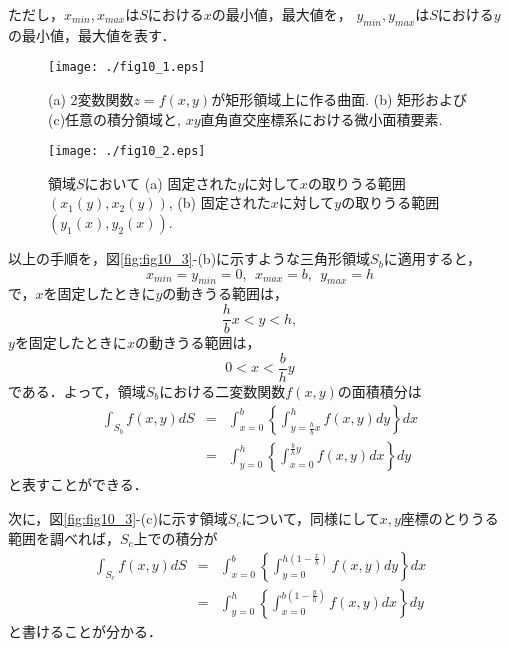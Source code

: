 \documentclass[10pt,a4j]{jarticle}
\begin{document}
ただし，$x_{min},x_{max}$は$S$における$x$の最小値，最大値を，
$y_{min},y_{max}$は$S$における$y$の最小値，最大値を表す．
\begin{figure}[h]
	\begin{center}
	\texttt{[image: ./fig10\_1.eps]} 
	\end{center}
	\caption{
		(a) 2変数関数$z=f(x,y)$が矩形領域上に作る曲面. 
		(b) 矩形および(c)任意の積分領域と, $xy$直角直交座標系における微小面積要素. 
	} 
	\label{fig:fig10_1}
\end{figure}
\begin{figure}[h]
	\begin{center}
	\texttt{[image: ./fig10\_2.eps]} 
	\end{center}
	\caption{
		領域$S$において
		(a) 固定された$y$に対して$x$の取りうる範囲$\left(x_1(y),x_2(y)\right)$, 
		(b) 固定された$x$に対して$y$の取りうる範囲$\left(y_1(x),y_2(x)\right)$. 
	} 
	\label{fig:fig10_2}
\end{figure}
以上の手順を，図\ref{fig:fig10_3}-(b)に示すような三角形領域$S_b$に適用すると，
\begin{equation}
	x_{min}=y_{min}=0, \ \ x_{max}=b, \ \ y_{max}=h
\end{equation}
で，$x$を固定したときに$y$の動きうる範囲は，
\begin{equation}
	\frac{h}{b}x < y < h, 
	\label{eqn:ybnd_Sb}
\end{equation}
$y$を固定したときに$x$の動きうる範囲は，
\begin{equation}
	0 < x < \frac{b}{h}y
	\label{eqn:xbnd_Sb}
\end{equation}
である．よって，領域$S_b$における二変数関数$f(x,y)$の面積積分は
\begin{eqnarray}
	\int_{S_b} f(x,y) dS
	&=&
	\int_{x=0}^b \left\{ \int_{y=\frac{h}{b}x}^h f(x,y)dy\right\} dx 
	\label{eqn:int_Sb_yx}
	\\
	&=&
	\int_{y=0}^h \left\{ \int_{x=0}^{\frac{b}{h}y} f(x,y)dx\right\}dy
	\label{eqn:int_Sb_xy}
\end{eqnarray}
と表すことができる．

次に，図\ref{fig:fig10_3}-(c)に示す領域$S_c$について，同様にして$x,y$座標のとりうる範囲を調べれば，$S_c$上での積分が
\begin{eqnarray}
	\int_{S_c} f(x,y) dS
	&=&
	\int_{x=0}^b \left\{ \int_{y=0}^{h\left(1-\frac{x}{b}\right)} f(x,y)dy\right\}dx 
	\label{eqn:int_Sc_yx}
	\\
	&=&
	\int_{y=0}^h \left\{ \int_{x=0}^{b\left(1-\frac{y}{h}\right)} f(x,y)dx\right\} dy
	\label{eqn:int_Sc_xy}
\end{eqnarray}
と書けることが分かる．
\end{document}
